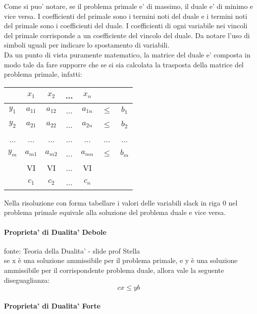 Come si puo' notare, se il problema primale e' di massimo, il duale e' di minimo e vice versa.
I coefficienti del primale sono i termini noti del duale e i termini noti del primale sono i coefficienti del duale.
I coefficienti di ogni variabile nei vincoli del primale corrisponde a un coefficiente del vincolo del duale.
Da notare l'uso di simboli uguali per indicare lo spostamento di variabili. \\

Da un punto di vista puramente matematico, la matrice del duale e' composta in modo tale da fare supporre che se si sia calcolata la trasposta della matrice del problema primale, infatti:

\begin{center}
    \begin{tabular}{||c c c c c c c||}
        \hline
        & $x_1$ & $x_2$ & ... & $x_n$ & & \\
        \hline
        \hline
        $y_{1}$ & $a_{11}$ & $a_{12}$ & ... & $a_{1n}$ & $\leq$ & $b_{1}$ \\
        \hline
        $y_{2}$ & $a_{21}$ & $a_{22}$ & ... & $a_{2n}$ & $\leq$ & $b_{2}$ \\
        \hline
        ... & ... & ... & ... & ... & ... & ... \\
        \hline
        $y_{m}$ & $a_{m1}$ & $a_{m2}$ & ... & $a_{mn}$ & $\leq$ & $b_{m}$ \\
        \hline
        & VI & VI & ... & VI & & \\
        \hline
        & $c_{1}$ & $c_{2}$ & ... & $c_{n}$ & & \\
        \hline
    \end{tabular}
\end{center}

Nella risoluzione con forma tabellare i valori delle variabili slack in riga 0 nel problema primale equivale alla soluzione del problema duale e vice versa.

\paragraph{Proprieta' di Dualita' Debole}
fonte: Teoria della Dualita' - slide prof Stella \\

se x è una soluzione ammissibile per il problema primale, e y è una soluzione ammissibile per il corrispondente problema duale, allora vale la seguente diseguaglianza:
\[
    cx \leq yb
\]

\paragraph{Proprieta' di Dualita' Forte}

